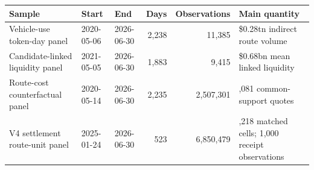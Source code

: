 \begingroup
\renewcommand{\arraystretch}{1.15}
\begin{tabularx}{\linewidth}{@{}>{\raggedright\arraybackslash}Xllrr>{\raggedright\arraybackslash}X@{}}
\toprule
Sample & Start & End & Days & Observations & Main quantity \\
\midrule
Vehicle-use token-day panel & 2020-05-06 & 2026-06-30 & 2,238 & 11,385 & \$0.28tn indirect route volume \\
Candidate-linked liquidity panel & 2021-05-05 & 2026-06-30 & 1,883 & 9,415 & \$0.68bn mean linked liquidity \\
Route-cost counterfactual panel & 2020-05-14 & 2026-06-30 & 2,235 & 2,507,301 & 813,081 common-support quotes \\
V4 settlement route-unit panel & 2025-01-24 & 2026-06-30 & 523 & 6,850,479 & 16,218 matched cells; 1,000 receipt observations \\
\bottomrule
\end{tabularx}
\endgroup
